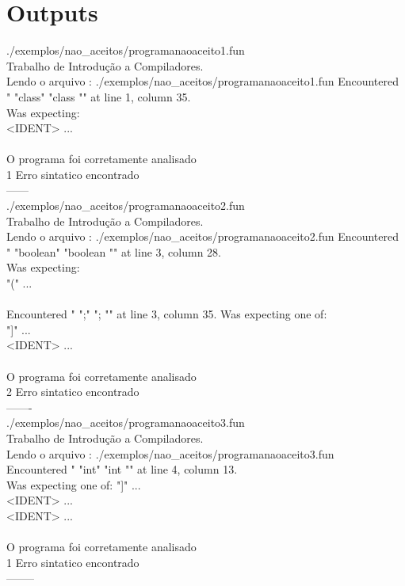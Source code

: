\documentclass[
	article,			%
	11pt,				%
	oneside,			%
	a4paper,			%
	portuguese,			%
	brazil,				%
	sumario=tradicional
	]{abntex2}
\begin{document}
\section{Outputs}
./exemplos/nao\_aceitos/programanaoaceito1.fun\\
Trabalho de Introdução a Compiladores.\\
Lendo o arquivo : ./exemplos/nao\_aceitos/programanaoaceito1.fun
Encountered " "class" "class "" at line 1, column 35.\\
Was expecting:\\
    <IDENT> ... \\
\\
O programa foi corretamente analisado\\
1 Erro sintatico encontrado\\
------\\
./exemplos/nao\_aceitos/programanaoaceito2.fun\\
Trabalho de Introdução a Compiladores.\\
Lendo o arquivo : ./exemplos/nao\_aceitos/programanaoaceito2.fun
Encountered " "boolean" "boolean "" at line 3, column 28.\\
Was expecting:\\
    "(" ...\\
\\
Encountered " ";" "; "" at line 3, column 35.
Was expecting one of:\\
    "]" ...\\
    <IDENT> ...\\
\\
O programa foi corretamente analisado\\
2 Erro sintatico encontrado\\
-------\\
./exemplos/nao\_aceitos/programanaoaceito3.fun\\
Trabalho de Introdução a Compiladores.\\
Lendo o arquivo : ./exemplos/nao\_aceitos/programanaoaceito3.fun\\
Encountered " "int" "int "" at line 4, column 13.\\
Was expecting one of:
    "]" ...\\
    <IDENT> ...\\
    <IDENT> ...\\
\\
O programa foi corretamente analisado\\
1 Erro sintatico encontrado\\
--------\\
\end{document}
